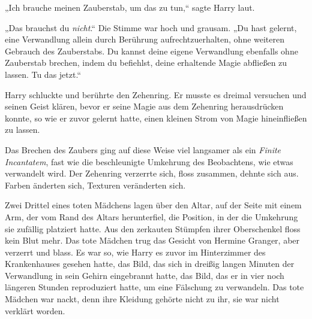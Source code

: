 „Ich brauche meinen Zauberstab, um das zu tun,“ sagte Harry laut.

„Das brauchst du \emph{nicht}.“ Die Stimme war hoch und grausam. „Du hast gelernt, eine Verwandlung allein durch Berührung aufrechtzuerhalten, ohne weiteren Gebrauch des Zauberstabs. Du kannst deine eigene Verwandlung ebenfalls ohne Zauberstab brechen, indem du befiehlst, deine erhaltende Magie abfließen zu lassen. Tu das jetzt.“

Harry schluckte und berührte den Zehenring. Er musste es dreimal versuchen und seinen Geist klären, bevor er seine Magie aus dem Zehenring herausdrücken konnte, so wie er zuvor gelernt hatte, einen kleinen Strom von Magie hineinfließen zu lassen.

Das Brechen des Zaubers ging auf diese Weise viel langsamer als ein \emph{Finite Incantatem}, fast wie die beschleunigte Umkehrung des Beobachtens, wie etwas verwandelt wird. Der Zehenring verzerrte sich, floss zusammen, dehnte sich aus. Farben änderten sich, Texturen veränderten sich.

Zwei Drittel eines toten Mädchens lagen über den Altar, auf der Seite mit einem Arm, der vom Rand des Altars herunterfiel, die Position, in der die Umkehrung sie zufällig platziert hatte. Aus den zerkauten Stümpfen ihrer Oberschenkel floss kein Blut mehr. Das tote Mädchen trug das Gesicht von Hermine Granger, aber verzerrt und blass.
Es war so, wie Harry es zuvor im Hinterzimmer des Krankenhauses gesehen hatte, das Bild, das sich in dreißig langen Minuten der Verwandlung in sein Gehirn eingebrannt hatte, das Bild, das er in vier noch längeren Stunden reproduziert hatte, um eine Fälschung zu verwandeln. Das tote Mädchen war nackt, denn ihre Kleidung gehörte nicht zu ihr, sie war nicht verklärt worden.

